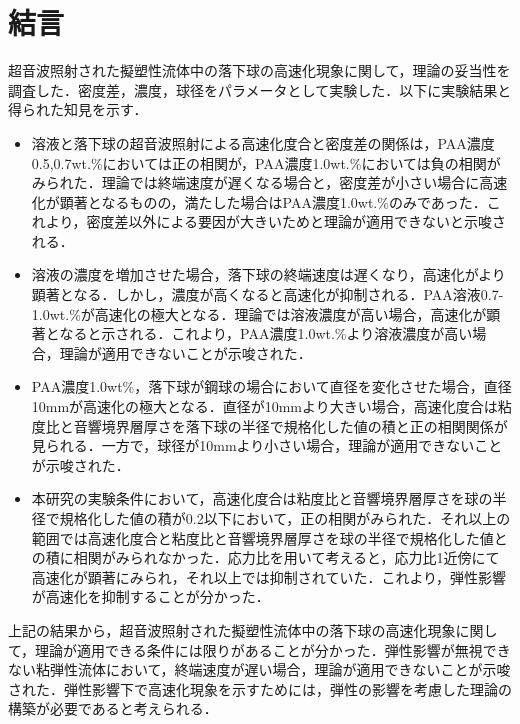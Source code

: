 \section{結言}
超音波照射された擬塑性流体中の落下球の高速化現象に関して，理論の妥当性を調査した．密度差，濃度，球径をパラメータとして実験した．以下に実験結果と得られた知見を示す．

\begin{itemize}
    \item 溶液と落下球の超音波照射による高速化度合と密度差の関係は，PAA濃度0.5,0.7wt.\%においては正の相関が，PAA濃度1.0wt.\%においては負の相関がみられた．理論では終端速度が遅くなる場合と，密度差が小さい場合に高速化が顕著となるものの，満たした場合はPAA濃度1.0wt.\%のみであった．これより，密度差以外による要因が大きいためと理論が適用できないと示唆される．
    \item 溶液の濃度を増加させた場合，落下球の終端速度は遅くなり，高速化がより顕著となる．しかし，濃度が高くなると高速化が抑制される．PAA溶液0.7-1.0wt.\%が高速化の極大となる．理論では溶液濃度が高い場合，高速化が顕著となると示される．これより，PAA濃度1.0wt.\%より溶液濃度が高い場合，理論が適用できないことが示唆された．
    \item PAA濃度1.0wt\%，落下球が鋼球の場合において直径を変化させた場合，直径10mmが高速化の極大となる．直径が10mmより大きい場合，高速化度合は粘度比と音響境界層厚さを落下球の半径で規格化した値の積と正の相関関係が見られる．一方で，球径が10mmより小さい場合，理論が適用できないことが示唆された．
    \item 本研究の実験条件において，高速化度合は粘度比と音響境界層厚さを球の半径で規格化した値の積が0.2以下において，正の相関がみられた．それ以上の範囲では高速化度合と粘度比と音響境界層厚さを球の半径で規格化した値との積に相関がみられなかった．応力比を用いて考えると，応力比1近傍にて高速化が顕著にみられ，それ以上では抑制されていた．これより，弾性影響が高速化を抑制することが分かった．
\end{itemize}

上記の結果から，超音波照射された擬塑性流体中の落下球の高速化現象に関して，理論が適用できる条件には限りがあることが分かった．弾性影響が無視できない粘弾性流体において，終端速度が遅い場合，理論が適用できないことが示唆された．弾性影響下で高速化現象を示すためには，弾性の影響を考慮した理論の構築が必要であると考えられる．